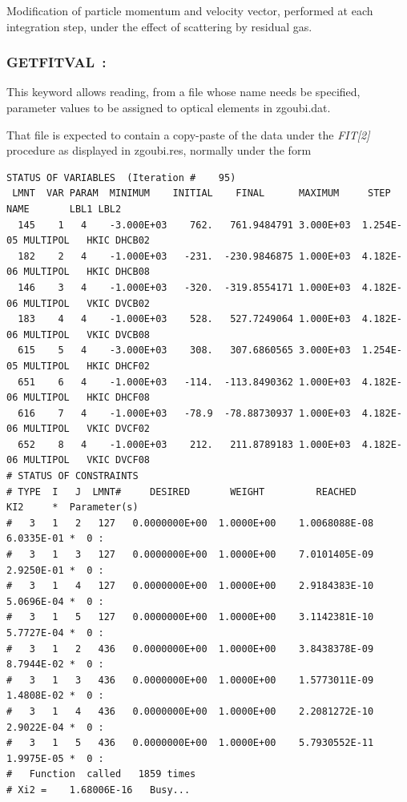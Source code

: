 Modification of particle momentum and velocity vector, performed at each integration step, 
under the effect of scattering by residual gas.

\bigskip




\newpage

\subsubsection*{GETFITVAL~: \GETFITVALTitl} \label{GETFITVAL}  
\medskip

This keyword allows reading, 
from a file whose name needs be specified,  parameter values to be assigned to optical elements in zgoubi.dat. 

\bigskip

\noindent That file is expected to contain a copy-paste of the data under the \textsl{FIT[2]} procedure as 
displayed in zgoubi.res, normally under the form \\
\begin{center}
{\footnotesize
\begin{verbatim}
STATUS OF VARIABLES  (Iteration #    95)
 LMNT  VAR PARAM  MINIMUM    INITIAL    FINAL      MAXIMUM     STEP    NAME       LBL1 LBL2
  145    1   4    -3.000E+03    762.   761.9484791 3.000E+03  1.254E-05 MULTIPOL   HKIC DHCB02
  182    2   4    -1.000E+03   -231.  -230.9846875 1.000E+03  4.182E-06 MULTIPOL   HKIC DHCB08  
  146    3   4    -1.000E+03   -320.  -319.8554171 1.000E+03  4.182E-06 MULTIPOL   VKIC DVCB02  
  183    4   4    -1.000E+03    528.   527.7249064 1.000E+03  4.182E-06 MULTIPOL   VKIC DVCB08  
  615    5   4    -3.000E+03    308.   307.6860565 3.000E+03  1.254E-05 MULTIPOL   HKIC DHCF02  
  651    6   4    -1.000E+03   -114.  -113.8490362 1.000E+03  4.182E-06 MULTIPOL   HKIC DHCF08  
  616    7   4    -1.000E+03   -78.9  -78.88730937 1.000E+03  4.182E-06 MULTIPOL   VKIC DVCF02  
  652    8   4    -1.000E+03    212.   211.8789183 1.000E+03  4.182E-06 MULTIPOL   VKIC DVCF08  
# STATUS OF CONSTRAINTS
# TYPE  I   J  LMNT#     DESIRED       WEIGHT         REACHED         KI2     *  Parameter(s) 
#   3   1   2   127   0.0000000E+00  1.0000E+00    1.0068088E-08   6.0335E-01 *  0 : 
#   3   1   3   127   0.0000000E+00  1.0000E+00    7.0101405E-09   2.9250E-01 *  0 : 
#   3   1   4   127   0.0000000E+00  1.0000E+00    2.9184383E-10   5.0696E-04 *  0 : 
#   3   1   5   127   0.0000000E+00  1.0000E+00    3.1142381E-10   5.7727E-04 *  0 : 
#   3   1   2   436   0.0000000E+00  1.0000E+00    3.8438378E-09   8.7944E-02 *  0 : 
#   3   1   3   436   0.0000000E+00  1.0000E+00    1.5773011E-09   1.4808E-02 *  0 : 
#   3   1   4   436   0.0000000E+00  1.0000E+00    2.2081272E-10   2.9022E-04 *  0 : 
#   3   1   5   436   0.0000000E+00  1.0000E+00    5.7930552E-11   1.9975E-05 *  0 : 
#   Function  called   1859 times
# Xi2 =    1.68006E-16   Busy...
\end{verbatim}
}
\end{center}

